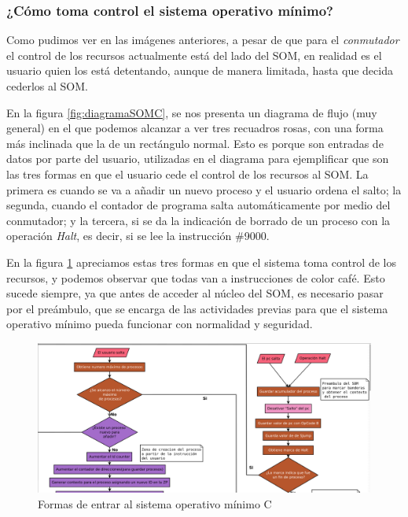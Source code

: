 \documentclass[letterpaper,12pt,oneside]{book}
\begin{document}
		
		\subsubsection{¿Cómo toma control el sistema operativo mínimo?}
		
		Como pudimos ver en las imágenes anteriores, a pesar de que para el \textit{conmutador} el control de los recursos actualmente está del lado
		del SOM, en realidad es el usuario quien los está detentando, aunque de manera limitada, hasta que decida cederlos al SOM. 
  
        En la figura \ref{fig:diagramaSOMC}, se nos presenta un diagrama de flujo (muy general) en el que podemos alcanzar a ver tres recuadros
		rosas, con una forma más inclinada que la de un rectángulo normal. Esto es porque son entradas de datos por parte del usuario, utilizadas en el 
		diagrama para ejemplificar que son las tres formas en que el usuario cede el control de los recursos al SOM. La primera es cuando
		se va a añadir un nuevo proceso y el usuario ordena el salto; la segunda, cuando el contador de programa salta automáticamente por medio del 
		conmutador; y la tercera,
		si se da la indicación de borrado de un proceso con la operación \textit{Halt}, es decir, si se lee la instrucción \#9000.
		
		
		En la figura \ref{fig:eccSOMCdiagent} apreciamos estas tres formas en que el sistema toma control de los recursos, y podemos observar que todas 
		van a instrucciones
		de color café. Esto sucede siempre, ya que antes de acceder al núcleo del SOM, es necesario pasar por el preámbulo, que se encarga de 
		las actividades 
		previas	para que el sistema operativo mínimo pueda funcionar con normalidad y seguridad.
		
		
		\begin{figure}[h]		
			\centering
			\includegraphics[scale=0.25]{media/CARDIACC/ecardiaccDiagrama_entradas.png}
			\caption{Formas de entrar al sistema operativo mínimo C}
			\label{fig:eccSOMCdiagent}
		\end{figure}
		
\end{document}
